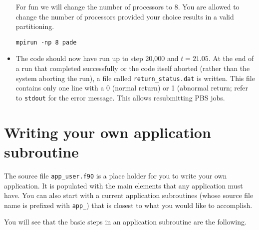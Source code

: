 \documentclass[11pt]{amsart}
\begin{document}
\begin{itemize}
For fun we will change the number of processors to 8.  You are allowed to change the number of processors provided your choice results in a valid partitioning.
\begin{verbatim}
mpirun -np 8 pade
\end{verbatim}
\item The code should now have run up to step 20,000 and $t = 21.05$.  At the end of a run that completed successfully or the code itself aborted (rather than the system aborting the run), a file called {\tt return\_status.dat} is written.  This file contains only one line with a 0 (normal return) or 1 (abnormal return; refer to {\tt stdout} for the error message. This allows resubmitting PBS jobs.  
\end{itemize}

\section{Writing your own application subroutine}

The source file {\tt app\_user.f90} is a place holder for you to write your own application.  It is populated with the main elements that any application must have.   You can also start with a current application subroutines (whose source file name is prefixed with {\tt app\_}) that is closest to what you would like to accomplish.

You will see that the basic steps in an application subroutine are the following.
\end{document}
